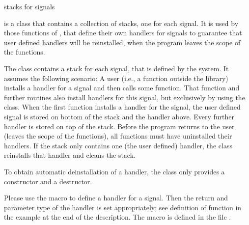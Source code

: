 


\NAME

 \dotfill stacks for signals



\ABSTRACT

 is a class that contains a collection of stacks, one for each signal.  It is
used by those functions of \LiDIA, that define their own handlers for signals to guarantee that
user defined handlers will be reinstalled, when the program leaves the scope of the \LiDIA
functions.



\DESCRIPTION

The class  contains a stack for each signal, that is defined by the system.
It assumes the following scenario: A user (i.e., a function outside the \LiDIA library) installs
a handler for a signal and then calls some \LiDIA function.  That function and further \LiDIA
routines also install handlers for this signal, but exclusively by using the 
class.  When the first \LiDIA function installs a handler for the signal, the user defined
signal is stored on bottom of the stack and the \LiDIA handler above.  Every further \LiDIA
handler is stored on top of the stack.  Before the program returns to the user (leaves the scope
of the \LiDIA functions), all \LiDIA functions must have uninstalled their handlers.  If the
stack only contains one (the user defined) handler, the  class reinstalls
that handler and cleans the stack.

To obtain automatic deinstallation of a handler, the class  only provides a
constructor and a destructor.

Please use the macro  to define a handler for a signal.  Then the
return and parameter type of the handler is set appropriately; see definition of function
 in the example at the end of the description.  The macro is defined in the file
.

